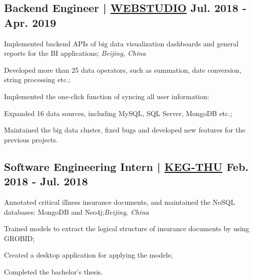 \subsection{{Backend Engineer | \href{http://www.wbdatavis.com/}{WEBSTUDIO} \hfill Jul. 2018 - Apr. 2019}}
\begin{zitemize}
    \item Implemented backend APIs of big data visualization dashboards and general reports for the BI applications; \hfill \textit{Beijing, China}
    \item Developed more than 25 data operators, such as summation, date conversion, string processing etc.;
    \item Implemented the one-click function of syncing all user information;
    \item Expanded 16 data sources, including MySQL, SQL Server, MongoDB etc.;
    \item Maintained the big data cluster, fixed bugs and developed new features for the previous projects.
\end{zitemize}

\subsection{{Software Engineering Intern | \href{https://keg.cs.tsinghua.edu.cn/}{KEG-THU} \hfill Feb. 2018 - Jul. 2018}}

\begin{zitemize}
    \item Annotated critical illness insurance documents, and maintained the NoSQL databases: MongoDB and Neo4j;\hfill \textit{Beijing, China}
    \item Trained models to extract the logical structure of insurance documents by using GROBID;
    \item Created a desktop application for applying the models;
    \item Completed the bachelor's thesis.
\end{zitemize}

